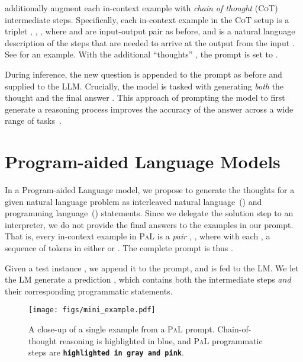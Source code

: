 \documentclass[dvipsnames]{article} \usepackage[accepted]{icml2022}
\newcommand{\ours}{\textsc{PaL}\xspace}
\newcommand{\prompt}{\xspace}
\newcommand{\cotp}{\textsc{CoT}\xspace}
\newcommand{\llm}{LLM\xspace}
\begin{document}
\citet{wei2022chain} additionally augment each in-context example with \textit{chain of thought} (\cotp) intermediate steps.
Specifically, each in-context example in the \cotp setup is a triplet , , , where  and  are input-output pair as before, and  is a natural language description of the steps that are needed to arrive at the output  from the input . See  for an example.
With the additional ``thoughts'' , the prompt is set to \prompt .


During inference, the new question  is appended to the prompt as before and supplied to the \llm.
Crucially, the model is tasked with generating \textit{both} the thought  and the final answer .
This approach of prompting the model to first generate a reasoning process  improves the accuracy of the answer  across a wide range of tasks~\citep{wang2022rationale,wei2022chain,zhou2022least,wang2022self}.



\section{Program-aided Language Models}

In a Program-aided Language model, we propose to generate the thoughts  for a given natural language problem  as interleaved natural language~(\nl) and programming language~(\pl) statements.
Since we delegate the solution step to an interpreter, we do not provide the final answers to the examples in our prompt. That is, every in-context example in \ours is a \emph{pair} , , where 
 with each , a sequence of tokens in either \nl or \pl. 
The complete prompt is thus \prompt .



Given a test instance , we append it to the prompt, and  is fed to the LM. 
We let the LM generate a prediction , which contains both the intermediate steps \emph{and} their corresponding programmatic statements.



\begin{figure}[h!]
    \centering
    \small
    \texttt{[image: figs/mini\_example.pdf]}
    \vspace{-6mm}
    \caption{
    A close-up of a single example from a \ours prompt. Chain-of-thought reasoning is \colorbox{cotcolor}{highlighted in blue}, and \ours programmatic steps are \colorbox{parcolorback}{\color{parcolortext}\texttt{\textbf{highlighted in gray and pink}}}.}
    \label{fig:miniexample}
\end{figure}
\end{document}
